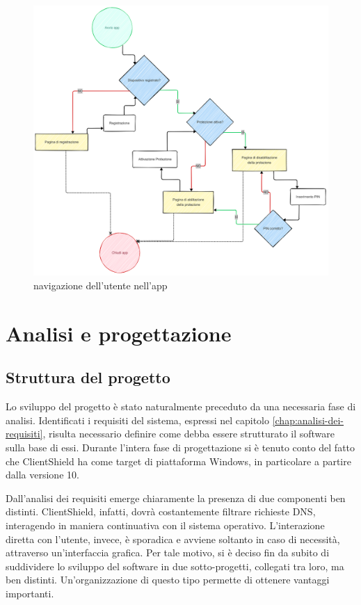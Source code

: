 \documentclass[12pt,a4paper,openright,twoside]{book}
\begin{document}
\begin{figure}[H]
	\centering
	\includegraphics[width=1.0\textwidth]{figures/schema-casi-uso.png}
	\caption{navigazione dell'utente nell'app}
	\label{fig:schema-casi-uso}
\end{figure}


\chapter{Analisi e progettazione}
\label{chap:analisi-e-progettazione}

\section{Struttura del progetto}

Lo sviluppo del progetto è stato naturalmente preceduto da una necessaria fase di analisi.
Identificati i requisiti del sistema, espressi nel capitolo \ref{chap:analisi-dei-requisiti}, risulta necessario definire come debba essere strutturato il software sulla base di essi.
Durante l'intera fase di progettazione si è tenuto conto del fatto che ClientShield ha come target di piattaforma Windows, in particolare a partire dalla versione 10.

Dall'analisi dei requisiti emerge chiaramente la presenza di due componenti ben distinti.
ClientShield, infatti, dovrà costantemente filtrare richieste \gls{DNS}, interagendo in maniera continuativa con il sistema operativo.
L'interazione diretta con l'utente, invece, è sporadica e avviene soltanto in caso di necessità, attraverso un'interfaccia grafica.
Per tale motivo, si è deciso fin da subito di suddividere lo sviluppo del software in due sotto-progetti, collegati tra loro, ma ben distinti.
Un'organizzazione di questo tipo permette di ottenere vantaggi importanti.
\end{document}
